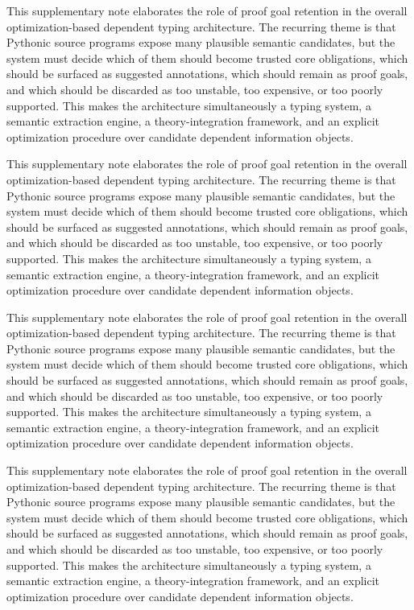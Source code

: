 \documentclass[11pt]{article}
\theoremstyle{definition}
\theoremstyle{plain}
\begin{document}
This supplementary note elaborates the role of proof goal retention in the overall
optimization-based dependent typing architecture. The recurring theme is that
Pythonic source programs expose many plausible semantic candidates, but the
system must decide which of them should become trusted core obligations, which
should be surfaced as suggested annotations, which should remain as proof
goals, and which should be discarded as too unstable, too expensive, or too
poorly supported. This makes the architecture simultaneously a typing system,
a semantic extraction engine, a theory-integration framework, and an explicit
optimization procedure over candidate dependent information objects.

This supplementary note elaborates the role of proof goal retention in the overall
optimization-based dependent typing architecture. The recurring theme is that
Pythonic source programs expose many plausible semantic candidates, but the
system must decide which of them should become trusted core obligations, which
should be surfaced as suggested annotations, which should remain as proof
goals, and which should be discarded as too unstable, too expensive, or too
poorly supported. This makes the architecture simultaneously a typing system,
a semantic extraction engine, a theory-integration framework, and an explicit
optimization procedure over candidate dependent information objects.

This supplementary note elaborates the role of proof goal retention in the overall
optimization-based dependent typing architecture. The recurring theme is that
Pythonic source programs expose many plausible semantic candidates, but the
system must decide which of them should become trusted core obligations, which
should be surfaced as suggested annotations, which should remain as proof
goals, and which should be discarded as too unstable, too expensive, or too
poorly supported. This makes the architecture simultaneously a typing system,
a semantic extraction engine, a theory-integration framework, and an explicit
optimization procedure over candidate dependent information objects.

This supplementary note elaborates the role of proof goal retention in the overall
optimization-based dependent typing architecture. The recurring theme is that
Pythonic source programs expose many plausible semantic candidates, but the
system must decide which of them should become trusted core obligations, which
should be surfaced as suggested annotations, which should remain as proof
goals, and which should be discarded as too unstable, too expensive, or too
poorly supported. This makes the architecture simultaneously a typing system,
a semantic extraction engine, a theory-integration framework, and an explicit
optimization procedure over candidate dependent information objects.
\end{document}
